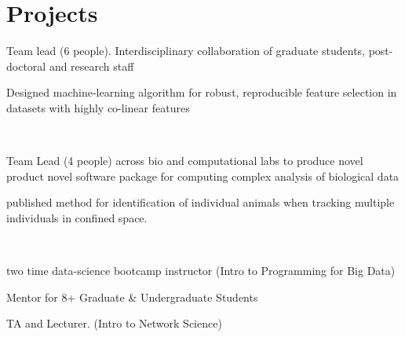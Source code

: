 \documentclass[]{winter-resume-openfont}
\begin{document}
\begin{minipage}[t]{0.65\textwidth}


\section{Projects}

\vspace{\topsep}
\begin{tightemize}
\item Team lead (6 people). Interdisciplinary collaboration of graduate students, post-doctoral and research staff
\item Designed machine-learning algorithm for robust, reproducible feature selection in datasets with highly co-linear features
\end{tightemize}

\vspace{\topsep} %

 \\
\begin{tightemize}
\item Team Lead (4 people) across bio and computational labs to produce novel product novel software package for computing complex analysis of biological data
 \item  published  method for identification of individual animals when tracking multiple individuals in confined space. 
\end{tightemize}

\sectionsep

 \\
\begin{tightemize}
\item two time data-science bootcamp instructor (Intro to Programming for Big Data)
\item Mentor for 8+ Graduate \& Undergraduate Students
\item TA and Lecturer. (Intro to Network Science)
\end{tightemize}


\end{minipage}
\end{document}
